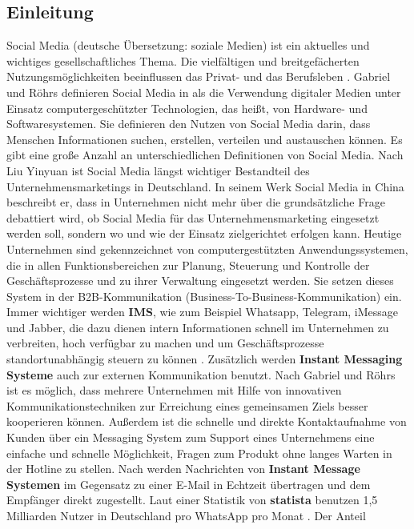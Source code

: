 \documentclass[a4paper,titlepage,halfparskip,12pt]{scrreprt}
\begin{document}
\cleardoublepage
{}
\listoffigures
\newpage
\cleardoublepage
{}
\listoftables
\newpage
\cleardoublepage
{}
\lstlistoflistings
\newpage

\begin{onehalfspacing}

\pagestyle{fancyheadlines}

\chapter{Einleitung}
\label{chap:Einleitung}

Social Media (deutsche Übersetzung: \glqq soziale Medien\grqq{}) ist ein aktuelles und wichtiges gesellschaftliches Thema. Die vielfältigen und breitgefächerten Nutzungsmöglichkeiten beeinflussen das Privat- und das Berufsleben \cite{gabriel2017social}. Gabriel und Röhrs definieren Social Media in \cite{gabriel2017social} als die Verwendung digitaler Medien unter Einsatz computergeschützter Technologien, das heißt, von Hardware- und Softwaresystemen. Sie definieren den Nutzen von Social Media darin, dass Menschen Informationen suchen, erstellen, verteilen und austauschen können. Es gibt eine große Anzahl an unterschiedlichen Definitionen von Social Media. Nach Liu Yinyuan ist Social Media längst wichtiger Bestandteil des Unternehmensmarketings in Deutschland. In seinem Werk \glqq Social Media in China\grqq{} \cite{liu2016social} beschreibt er, dass in Unternehmen nicht mehr über die grundsätzliche Frage debattiert wird, ob Social Media für das Unternehmensmarketing eingesetzt werden soll, sondern wo und wie der Einsatz zielgerichtet erfolgen kann. Heutige Unternehmen sind gekennzeichnet von computergestützten Anwendungssystemen, die in allen Funktionsbereichen zur Planung, Steuerung und Kontrolle der Geschäftsprozesse und zu ihrer Verwaltung eingesetzt werden. Sie setzen dieses System in der B2B-Kommunikation (Business-To-Business-Kommunikation) ein. Immer wichtiger werden \textbf{\ac{IMS}}, wie zum Beispiel Whatsapp, Telegram, iMessage und Jabber, die dazu dienen intern Informationen schnell im Unternehmen zu verbreiten, hoch verfügbar zu machen und um Geschäftsprozesse standortunabhängig steuern zu können \cite{gabriel2017social}. Zusätzlich werden \textbf{Instant Messaging Systeme} auch zur externen Kommunikation benutzt. Nach Gabriel und Röhrs ist es möglich, dass mehrere Unternehmen mit Hilfe von innovativen Kommunikationstechniken zur Erreichung eines gemeinsamen Ziels besser kooperieren können. Außerdem ist die schnelle und direkte Kontaktaufnahme von Kunden über ein Messaging System zum Support eines Unternehmens eine einfache und schnelle Möglichkeit, Fragen zum Produkt ohne langes Warten in der Hotline zu stellen. Nach \cite{b2bmehner} werden Nachrichten von \textbf{Instant Message Systemen} im Gegensatz zu einer E-Mail in Echtzeit übertragen und dem Empfänger direkt zugestellt. Laut einer Statistik von \textbf{statista} benutzen 1,5 Milliarden Nutzer in Deutschland pro WhatsApp pro Monat \cite{statistaIMS}. Der Anteil 
\end{onehalfspacing}
\end{document}
